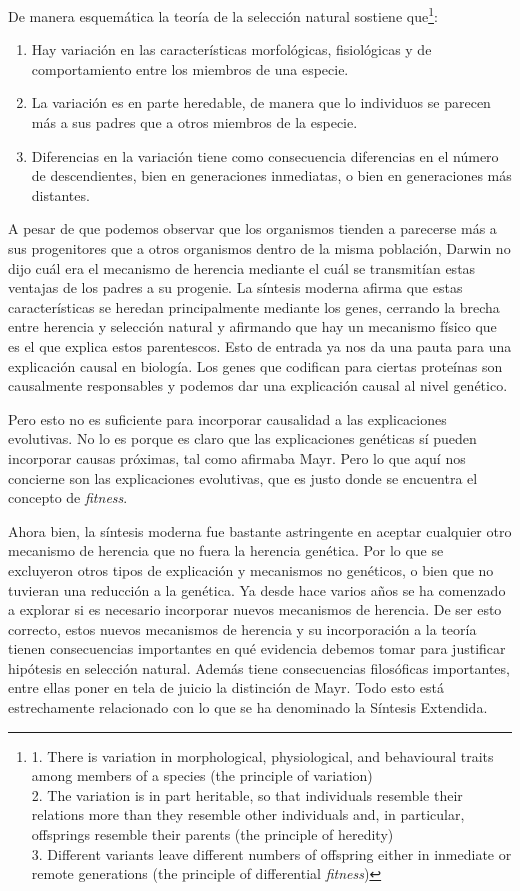 De manera esquemática la teoría de la selección natural sostiene que\footnote{1. There is variation in morphological, physiological, and behavioural traits among members of a species (the principle of variation) \\
2. The variation is in part heritable, so that individuals resemble their relations more than they resemble other individuals and, in particular, offsprings resemble their parents (the principle of heredity) \\
3. Different variants leave different numbers of offspring either in inmediate or remote generations (the principle of differential \emph{fitness})}:

\begin{enumerate}
  \item Hay variación en las características morfológicas, fisiológicas y de comportamiento entre los miembros de una especie.
  \item La variación es en parte heredable, de manera que lo individuos se parecen más a sus padres que a otros miembros de la especie.
  \item Diferencias en la variación tiene como consecuencia diferencias en el número de descendientes, bien en generaciones inmediatas, o bien en generaciones más distantes\cite{Godfrey-Smith2013}.
\end{enumerate}

A pesar de que podemos observar que los organismos tienden a parecerse más a sus progenitores que a otros organismos dentro de la misma población, Darwin no dijo cuál era el mecanismo de herencia mediante el cuál se transmitían estas ventajas de los padres a su progenie. La síntesis moderna afirma que estas características se heredan principalmente mediante los genes, cerrando la brecha entre herencia y selección natural y afirmando que hay un mecanismo físico que es el que explica estos parentescos. Esto de entrada ya nos da una pauta para una explicación causal en biología. Los genes que codifican para ciertas proteínas son causalmente responsables y podemos dar una explicación causal al nivel genético.

Pero esto no es suficiente para incorporar causalidad a las explicaciones evolutivas. No lo es porque es claro que las explicaciones genéticas sí pueden incorporar causas próximas, tal como afirmaba Mayr. Pero lo que aquí nos concierne son las explicaciones evolutivas, que es justo donde se encuentra el concepto de \emph{fitness}.

Ahora bien, la síntesis moderna fue bastante astringente en aceptar cualquier otro mecanismo de herencia que no fuera la herencia genética. Por lo que se excluyeron otros tipos de explicación y mecanismos no genéticos, o bien que no tuvieran una reducción a la genética. Ya desde hace varios años se ha comenzado a explorar si es necesario incorporar nuevos mecanismos de herencia. De ser esto correcto, estos nuevos mecanismos de herencia y su incorporación a la teoría tienen consecuencias importantes en qué evidencia debemos tomar para justificar hipótesis en selección natural. Además tiene consecuencias filosóficas importantes, entre ellas poner en tela de juicio la distinción de Mayr. Todo esto está estrechamente relacionado con lo que se ha denominado la Síntesis Extendida.

